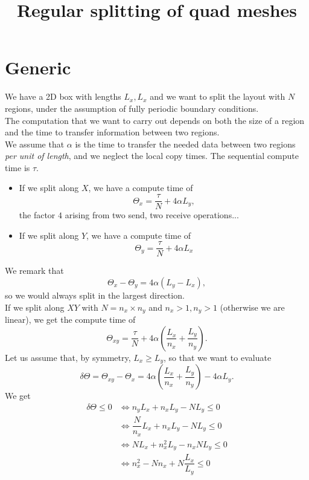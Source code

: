 \documentclass[aps]{revtex4}
\begin{document}
\title{Regular splitting of quad meshes}
\maketitle

\section{Generic}

We have a 2D box with lengths $L_x,L_x$ and
we want to split the layout with $N$ regions, under the assumption
of fully periodic boundary conditions.\\
 The computation
that we want to carry out depends on both the size of
a region and the time to transfer information between two
regions.\\
We assume that $\alpha$ is the time to transfer the needed data 
between two regions \emph{per unit of length}, and
we neglect the local copy times.
The sequential compute time is $\tau$.
\begin{itemize}
\item If we split along $X$, we have a compute time of
\begin{equation}
	\Theta_x = \dfrac{\tau}{N} + 4\alpha L_y,
\end{equation}
the factor $4$ arising from two send, two receive operations...

\item If we split along $Y$, we have a compute time of
\begin{equation}
	\Theta_y = \dfrac{\tau}{N} + 4\alpha L_x
\end{equation}
\end{itemize}

We remark that
\begin{equation}
	\Theta_x - \Theta_y = 4\alpha\left(L_y-L_x\right),
\end{equation}
so we would always split in the largest direction.\\


If we split along $XY$ with $N=n_x \times n_y$ and $n_x>1,n_y>1$ (otherwise we are linear),
we get the compute time of
\begin{equation}
	\Theta_{xy} = \dfrac{\tau}{N} + 4\alpha\left(\dfrac{L_x}{n_x}+\dfrac{L_y}{n_y}\right).
\end{equation}
Let us assume that, by symmetry, $L_x\geq L_y$, so that we want to evaluate
\begin{equation}
	\delta \Theta = \Theta_{xy}-\Theta_x = 4\alpha\left(\dfrac{L_x}{n_x}+\dfrac{L_y}{n_y}\right) -
	4\alpha L_y.
\end{equation}	
We get
\begin{align}
	\delta \Theta \leq 0 & \Leftrightarrow n_yL_x + n_xL_y - N L_y \leq 0 \\
	& \Leftrightarrow \dfrac{N}{n_x} L_x + n_x L_y - N L_y \leq 0\\
	& \Leftrightarrow N L_x + n_x^2 L_y - n_x N L_y \leq 0\\
	& \Leftrightarrow n_x^2 - N n_x + N \dfrac{L_x}{L_y} \leq 0
\end{align}
\end{document}
